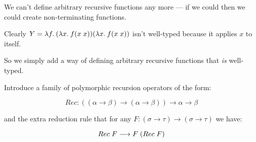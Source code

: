 \begin{slide*}


\vspace*{0.5cm}

We can't define arbitrary recursive functions any more --- if we could then we
could create non-terminating functions.

Clearly {\red $Y = \lambda f.\: (\lambda x.\: f(x\; x)) (\lambda x.\: f(x\; x))$} isn't
well-typed because it applies {\red $x$} to itself.

So we simply add a way of defining arbitrary recursive functions that {\em is}
well-typed.

Introduce a family of polymorphic recursion operators of the form:

{\red $$ Rec : ((\alpha \to \beta) \to (\alpha \to \beta)) \to \alpha \to \beta
$$}

and the extra reduction rule that for any {\red $F:(\sigma \to \tau) \to
(\sigma \to \tau)$} we have:

{\red $$ Rec\; F \longrightarrow F\; (Rec\;  F) $$}

\end{slide*}




